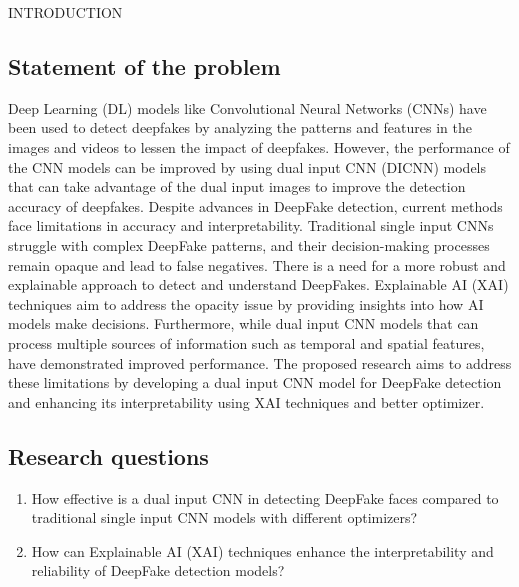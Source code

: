\begin{section}[]{\uppercase{Introduction}}
    \subsection{Statement of the problem}
    Deep Learning (DL) models like Convolutional Neural Networks (CNNs) have been used to detect deepfakes by analyzing the patterns and features in the images and videos to lessen the impact of deepfakes. \cite{Tolosana2020}
    However, the performance of the CNN models can be improved by using dual input CNN (DICNN) models that can take advantage of the dual input images to improve the detection accuracy of deepfakes. \cite{Bhandari2023}
    Despite advances in DeepFake detection, current methods face limitations in accuracy and interpretability. Traditional single input CNNs struggle with complex DeepFake patterns, and their decision-making processes remain opaque and lead to false negatives. There is a need for a more robust and explainable approach to detect and understand DeepFakes. Explainable AI (XAI) techniques aim to address the opacity issue by providing insights into how AI models make decisions. Furthermore, while dual input CNN models that can process multiple sources of information such as temporal and spatial features, have demonstrated improved performance.
    The proposed research aims to address these limitations by developing a dual input CNN model for DeepFake detection and enhancing its interpretability using XAI techniques and better optimizer.

    \subsection{Research questions}

    \begin{enumerate}[label=\bf{Q\arabic*}]
        \item How effective is a dual input CNN in detecting DeepFake faces compared to traditional single input CNN models with different optimizers?
            \item How can Explainable AI (XAI) techniques enhance the interpretability and reliability of DeepFake detection models?
    \end{enumerate}


\end{section}
